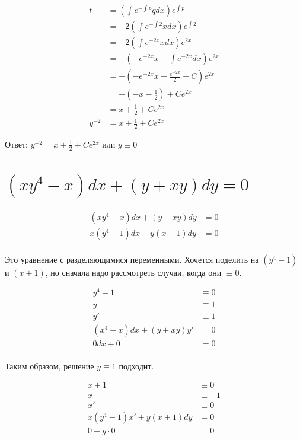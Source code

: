 \begin{align*}
    t      & = \left(\int e^{-\int p} qdx\right) e^{\int p}            \\
           & = -2\left(\int e^{-\int 2} xdx\right) e^{\int 2}          \\
           & = -2\left(\int e^{-2x} xdx\right) e^{2x}                  \\
           & = -\left(-e^{-2x}x + \int e^{-2x}dx\right) e^{2x}         \\
           & = -\left(-e^{-2x}x - \frac{e^{-2x}}{2} + C \right) e^{2x} \\
           & = -\left(-x - \frac{1}{2} \right) + Ce^{2x}               \\
           & = x + \frac{1}{2} + Ce^{2x}                               \\
    y^{-2} & = x + \frac{1}{2} + Ce^{2x}
\end{align*}

Ответ: $y^{-2} = x + \frac{1}{2} + Ce^{2x}$ или $y\equiv0$

\section{$(xy^4-x)dx+(y+xy)dy=0$}

\begin{align*}
    (xy^4-x)dx+(y+xy)dy & = 0 \\
    x(y^4-1)dx+y(x+1)dy & = 0 \\
\end{align*}

Это уравнение с разделяющимися переменными. Хочется поделить на $(y^4-1)$ и $(x+1)$, но сначала надо рассмотреть случаи, когда они $\equiv0$.

\begin{align*}
    y^4 - 1                & \equiv 0 \\
    y                      & \equiv 1 \\
    y'                     & \equiv 1 \\
    (x^4 - x)dx + (y+xy)y' & = 0      \\
    0dx + 0                & = 0      \\
\end{align*}

Таким образом, решение $y \equiv 1$ подходит.

\begin{align*}
    x + 1               & \equiv 0  \\
    x                   & \equiv -1 \\
    x'                  & \equiv 0  \\
    x(y^4-1)x'+y(x+1)dy & = 0       \\
    0+y\cdot 0          & = 0       \\
\end{align*}


